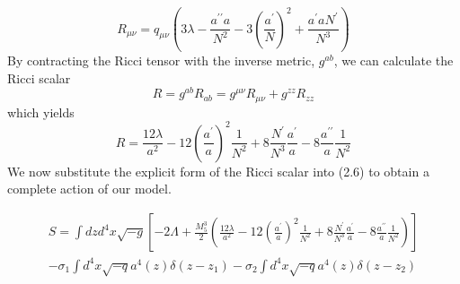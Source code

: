 \documentclass[11pt]{report}
\numberwithin{equation}{chapter}
\begin{document}
\begin{equation}
    R_{\mu\nu} = q_{\mu\nu}\left(3\lambda - \frac{a^{\prime\prime}a}{N^2} - 3\left(\frac{a^\prime}{N}\right)^2 + \frac{a^\prime aN^\prime}{N^3}\right)
\end{equation}
By contracting the Ricci tensor with the inverse metric, $g^{ab}$, we can calculate the Ricci scalar
\begin{equation}
    R = g^{ab}R_{ab} = g^{\mu\nu}R_{\mu\nu} + g^{zz}R_{zz}
\end{equation}
which yields
\begin{equation}
    R = \frac{12\lambda}{a^2} - 12\left(\frac{a^\prime}{a}\right)^2\frac{1}{N^2}+8\frac{N^\prime}{N^3}\frac{a^\prime}{a}-8\frac{a^{\prime\prime}}{a}\frac{1}{N^2}
\end{equation}
We now substitute the explicit form of the Ricci scalar into (2.6) to obtain a complete action of our model.

\begin{equation}
   \begin{aligned}    
    S = \int dzd^4x\sqrt{-g}\left[-2\Lambda + \frac{M_{5}^3}{2}\left(\frac{12\lambda}{a^2} - 12\left(\frac{a^\prime}{a}\right)^2\frac{1}{N^2}+8\frac{N^\prime}{N^3}\frac{a^\prime}{a}-8\frac{a^{\prime\prime}}{a}\frac{1}{N^2}\right)\right]\\ - \sigma_1\int d^4x\sqrt{-q}a^4(z)\delta(z-z_1) - \sigma_2\int d^4x\sqrt{-q}a^4(z)\delta(z-z_2)
   \end{aligned}
\end{equation}
\end{document}
